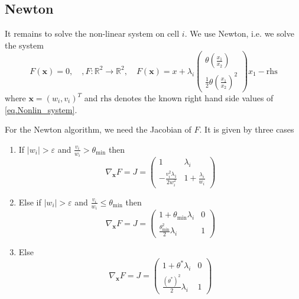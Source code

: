\documentclass[3p]{scrartcl}%
\newcommand{\xx}{{\boldsymbol{x}}}
\begin{document}
    \subsection{Newton}
    It remains to solve the non-linear system on cell $i$. We use Newton, i.e. we solve the system
    \begin{equation}
        F(\xx) = 0, \quad , F: \mathbb{R}^2 \to \mathbb{R}^2, \quad F(\xx) = x + \lambda_i
        \begin{pmatrix}
            \theta\left(\frac{x_1}{x_2}\right) \\\frac{1}{2}\theta\left(\frac{x_1}{x_2}\right)^2
        \end{pmatrix} x_1 - \text{rhs}
    \end{equation}
    where $\xx = (w_i, v_i)^T$ and $\text{rhs}$ denotes the known right hand side values of \eqref{eq.Nonlin_system}.

    For the Newton algorithm, we need the Jacobian of $F$.
    It is given by three cases
    \begin{enumerate}
        \item If $|w_i| > \varepsilon$ and $\frac{v_i}{w_i} > \theta_{\min}$ then
        \begin{equation}
            \nabla_\xx F = J = \begin{pmatrix}
                1 & \lambda_i \\
                - \frac{v_i^2 \lambda_1}{2 w_i^2} & 1 + \frac{\lambda_i}{w_i}
            \end{pmatrix}
        \end{equation}
        \item Else if $|w_i| > \varepsilon$ and $\frac{v_i}{w_i} \leq \theta_{\min}$ then
                \begin{equation}
            \nabla_\xx F = J = \begin{pmatrix}
                1 + \theta_{\min} \lambda_i & 0 \\
                \frac{\theta_{\min}^2}{2}\lambda_i & 1
            \end{pmatrix}
        \end{equation}
        \item Else
         \begin{equation}
             \nabla_\xx F = J = \begin{pmatrix}
                 1 + \theta^\ast \lambda_i & 0 \\
                 \frac{(\theta^\ast)^2}{2}\lambda_i & 1
             \end{pmatrix}
         \end{equation}
    \end{enumerate}
\end{document}
